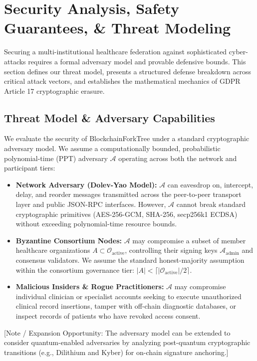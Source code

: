 \section{Security Analysis, Safety Guarantees, \& Threat Modeling}
\label{sec:security_threat_model}

Securing a multi-institutional healthcare federation against sophisticated cyber-attacks requires a formal adversary model and provable defensive bounds. This section defines our threat model, presents a structured defense breakdown across critical attack vectors, and establishes the mathematical mechanics of GDPR Article 17 cryptographic erasure.

\subsection{Threat Model \& Adversary Capabilities}
We evaluate the security of BlockchainForkTree under a standard cryptographic adversary model. We assume a computationally bounded, probabilistic polynomial-time (PPT) adversary $\mathcal{A}$ operating across both the network and participant tiers:
\begin{itemize}
    \item \textbf{Network Adversary (Dolev-Yao Model):} $\mathcal{A}$ can eavesdrop on, intercept, delay, and reorder messages transmitted across the peer-to-peer transport layer and public JSON-RPC interfaces. However, $\mathcal{A}$ cannot break standard cryptographic primitives (AES-256-GCM, SHA-256, secp256k1 ECDSA) without exceeding polynomial-time resource bounds.
    \item \textbf{Byzantine Consortium Nodes:} $\mathcal{A}$ may compromise a subset of member healthcare organizations $A \subset \mathcal{O}_{\text{active}}$, controlling their signing keys $\mathcal{A}_{\text{admin}}$ and consensus validators. We assume the standard honest-majority assumption within the consortium governance tier: $|A| < \lceil |\mathcal{O}_{\text{active}}| / 2 \rceil$.
    \item \textbf{Malicious Insiders \& Rogue Practitioners:} $\mathcal{A}$ may compromise individual clinician or specialist accounts seeking to execute unauthorized clinical record insertions, tamper with off-chain diagnostic databases, or inspect records of patients who have revoked access consent.
\end{itemize}

[Note / Expansion Opportunity: The adversary model can be extended to consider quantum-enabled adversaries by analyzing post-quantum cryptographic transitions (e.g., Dilithium and Kyber) for on-chain signature anchoring.]

